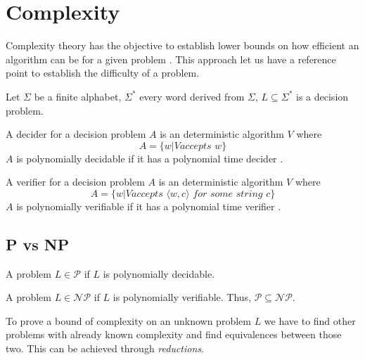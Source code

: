 \section{Complexity}
\label{sec:complex}

Complexity theory has the objective to establish lower bounds on how efficient
an algorithm can be for a given problem \cite{sipser2006}. This approach let us
have a reference point to establish the difficulty of a problem.


\begin{defn}
Let $\Sigma$ be a finite alphabet, $\Sigma^*$ every word derived from $\Sigma$, $L \subseteq \Sigma^*$ is a decision problem.
\end{defn}

\begin{defn}
  A decider for a decision problem $A$ is an deterministic algorithm $V$ where
    $$A = \{w | V \textit{accepts } w\}$$
  $A$ is polynomially decidable if it has a polynomial time decider \cite{sipser2006}.
\end{defn}

\begin{defn}
A verifier for a decision problem $A$ is an deterministic algorithm $V$ where
  $$A = \{w | V \textit{accepts } \langle w,c\rangle \textit{ for some string } c\}$$
$A$ is polynomially verifiable if it has a polynomial time verifier \cite{sipser2006}.
\end{defn}

\subsection{P vs NP}

\begin{defn}
A problem $L \in \mathcal{P}$ if $L$ is polynomially decidable.
\end{defn}

\begin{defn}
A problem $L \in \mathcal{NP}$ if $L$ is polynomially verifiable. Thus, $\mathcal{P} \subseteq \mathcal{NP}$.
\end{defn}

To prove a bound of complexity on an unknown problem $L$ we have to find other
problems with already known complexity and find equivalences between those two. This
can be achieved through \textit{reductions}.

